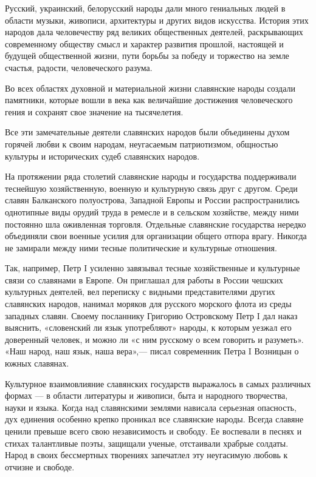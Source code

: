 \documentclass[12pt, a4paper, openany]{book}
\begin{document}
Русский, украинский, белорусский народы дали много гениальных людей в области музыки, живописи, архитектуры и других видов искусства. История этих народов дала человечеству ряд великих общественных деятелей, раскрывающих современному обществу смысл и характер развития прошлой, настоящей и будущей общественной жизни, пути борьбы за победу и торжество на земле счастья, радости, человеческого разума.

Во всех областях духовной и материальной жизни славянские народы создали памятники, которые вошли в века как величайшие достижения человеческого гения и сохранят свое значение на тысячелетия.

Все эти замечательные деятели славянских народов были объединены духом горячей любви к своим народам, неугасаемым патриотизмом, общностью культуры и исторических судеб славянских народов.

На протяжении ряда столетий славянские народы и государства поддерживали теснейшую хозяйственную, военную и культурную связь друг с другом. Среди славян Балканского полуострова, Западной Европы и России распространились однотипные виды орудий труда в ремесле и в сельском хозяйстве, между ними постоянно шла оживленная торговля. Отдельные славянские государства нередко объединяли свои военные усилия для организации общего отпора врагу. Никогда не замирали между ними тесные политические и культурные отношения.

Так, например, Петр I усиленно завязывал тесные хозяйственные и культурные связи со славянами в Европе. Он приглашал для работы в России чешских культурных деятелей, вел переписку с видными представителями других славянских народов, нанимал моряков для русского морского флота из среды западных славян. Своему посланнику Григорию Островскому Петр I дал наказ выяснить, «словенский ли язык употребляют» народы, к которым уезжал его доверенный человек, и можно ли «с ним русскому о всем говорить и разуметь». «Наш народ, наш язык, наша вера»,— писал современник Петра I Возницын о южных славянах.

Культурное взаимовлияние славянских государств выражалось в самых различных формах — в области литературы и живописи, быта и народного творчества, науки и языка. Когда над славянскими землями нависала серьезная опасность, дух единения особенно крепко проникал все славянские народы. Всегда славяне ценили превыше всего свою независимость и свободу. Ее воспевали в песнях и стихах талантливые поэты, защищали ученые, отстаивали храбрые солдаты. Народ в своих бессмертных творениях запечатлел эту неугасимую любовь к отчизне и свободе.
\end{document}

